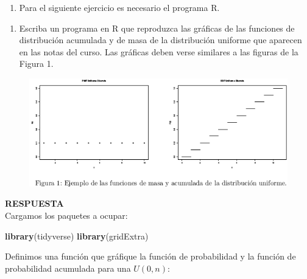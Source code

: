 \documentclass[11pt,]{article}
\title{}
\author{}
\date{}
\newenvironment{Shaded}{\begin{snugshade}}{\end{snugshade}}
\newcommand{\KeywordTok}[1]{\textcolor[rgb]{0.13,0.29,0.53}{\textbf{#1}}}
\newcommand{\NormalTok}[1]{#1}
\providecommand{\tightlist}{%
  \setlength{\itemsep}{0pt}\setlength{\parskip}{0pt}}
\newcommand{\res}{\textbf{RESPUESTA}\\}
\begin{document}
\begin{enumerate}
\def\labelenumi{\arabic{enumi}.}
\setcounter{enumi}{3}
\tightlist
\item
  Para el siguiente ejercicio es necesario el programa \textsc{R}.
\end{enumerate}

\begin{enumerate}
\def\labelenumi{\alph{enumi}.}
\tightlist
\item
  Escriba un programa en \textsc{R} que reproduzca las gráficas de las
  funciones de distribución acumulada y de masa de la distribución
  uniforme que aparecen en las notas del curso. Las gráficas deben verse
  similares a las figuras de la Figura 1.
\end{enumerate}

\begin{figure}
\begin{center}
\includegraphics[scale=1]{ejercicio_4-graficas.png}
\end{center}
\end{figure}

\res

Cargamos los paquetes a ocupar:

\begin{Shaded}
\begin{Highlighting}[]
\KeywordTok{library}\NormalTok{(tidyverse)}
\KeywordTok{library}\NormalTok{(gridExtra)}
\end{Highlighting}
\end{Shaded}

Definimos una función que gráfique la función de probabilidad y la
función de probabilidad acumulada para una \(U(0,n)\):
\end{document}
